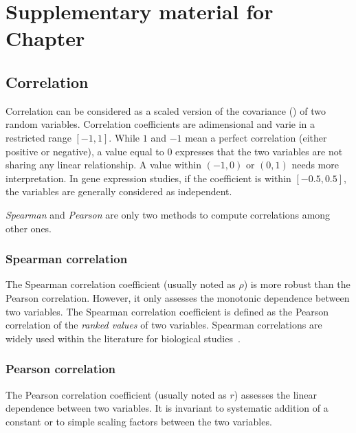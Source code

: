 \chapter{Suppl\texorpdfstring{ementary}{.} material for Chap\texorpdfstring{ter}{.}
}\label{ch:SupplExpress}

\section{Correlation}\label{sec:CorrMore}
Correlation can be considered as a scaled version of the covariance
() of two random variables.
Correlation coefficients are adimensional and varie in a restricted range $[-1,1]$.
While $1$ and $-1$ mean a perfect correlation (either positive or negative),
a value equal to $0$ expresses
that the two variables are not sharing any linear relationship.
A value within $(-1,0)$
or $(0,1)$ needs more interpretation.
In gene expression studies, if the coefficient is within $[-0.5,0.5]$,
the variables are generally considered as independent.

\emph{Spearman} and \emph{Pearson} are only two methods to compute correlations
among other ones.

\subsection{Spearman correlation}\label{subsec:SpearmanCor}
The Spearman correlation coefficient (usually noted as $\rho$)
is more robust than the Pearson correlation.
However, it only assesses the monotonic dependence between two variables.
The Spearman correlation coefficient is defined
as the Pearson correlation of the \emph{ranked values} of two variables.
Spearman correlations are widely used
within the literature for biological studies~.

\subsection{Pearson correlation}\label{subsec:PearsonCor}
The Pearson correlation coefficient (usually noted as $r$) assesses the linear
dependence between two variables.
It is invariant to systematic addition of a constant
or to simple scaling factors between the two variables.


